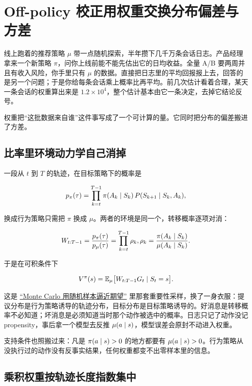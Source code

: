 \section{Off-policy 校正用权重交换分布偏差与方差}
\label{sec:16-Control-and-Reinforcement-Learning/02-Reinforcement-Learning/08}

线上跑着的推荐策略 \(\mu\) 带一点随机探索，半年攒下几千万条会话日志。产品经理拿来一个新策略 \(\pi\)，问你上线前能不能先估出它的日均收益。全量 A/B 要两周并且有收入风险，你手里只有 \(\mu\) 的数据。直接把日志里的平均回报报上去，回答的是另一个问题；于是你给每条会话乘上概率比再平均。前几次估计看着合理，某天一条会话的权重算出来是 \(1.2\times10^{4}\)，整个估计基本由它一条决定，去掉它结论反号。

权重把``这批数据来自谁''这件事写成了一个可计算的量。它同时把分布的偏差搬进了方差。

\subsection{比率里环境动力学自己消掉}

一段从 \(t\) 到 \(T\) 的轨迹，在目标策略下的概率是

\[
p_\pi(\tau)=\prod_{k=t}^{T-1}\pi(A_k\mid S_k)\,P(S_{k+1}\mid S_k,A_k),
\]

换成行为策略只需把 \(\pi\) 换成 \(\mu\)。两者的环境是同一个，转移概率逐项对消：

\[
W_{t:T-1}=\frac{p_\pi(\tau)}{p_\mu(\tau)}=\prod_{k=t}^{T-1}\rho_k,
\space
\rho_k=\frac{\pi(A_k\mid S_k)}{\mu(A_k\mid S_k)}.
\]

于是在可积条件下

\[
V^\pi(s)=\mathbb{E}_\mu\big[W_{t:T-1}G_t\mid S_t=s\big].
\]

这是 \hyperref[sec:13-Machine-Learning/08-Sampling-and-Inference/01]{``Monte Carlo 用随机样本逼近期望''} 里那套重要性采样，换了一身衣服：提议分布是行为策略诱导的轨迹分布，目标分布是目标策略诱导的。好消息是转移概率不必知道；坏消息是必须知道当时那个动作被选中的概率。日志只记了动作没记 propensity，事后拿一个模型去反推 \(\mu(a\mid s)\)，模型误差会原封不动进入权重。

支持条件也照搬过来：凡是 \(\pi(a\mid s)>0\) 的地方都要有 \(\mu(a\mid s)>0\)。行为策略从没执行过的动作没有反事实结果，任何权重都变不出零样本里的信息。

\subsection{乘积权重按轨迹长度指数集中}

